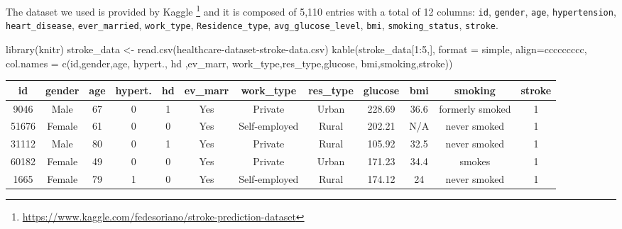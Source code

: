 \documentclass[
]{article}
\newenvironment{Shaded}{\begin{snugshade}}{\end{snugshade}}
\newcommand{\AttributeTok}[1]{\textcolor[rgb]{0.77,0.63,0.00}{#1}}
\newcommand{\DecValTok}[1]{\textcolor[rgb]{0.00,0.00,0.81}{#1}}
\newcommand{\FunctionTok}[1]{\textcolor[rgb]{0.00,0.00,0.00}{#1}}
\newcommand{\NormalTok}[1]{#1}
\newcommand{\OtherTok}[1]{\textcolor[rgb]{0.56,0.35,0.01}{#1}}
\newcommand{\SpecialCharTok}[1]{\textcolor[rgb]{0.00,0.00,0.00}{#1}}
\newcommand{\StringTok}[1]{\textcolor[rgb]{0.31,0.60,0.02}{#1}}
\begin{document}
The dataset we used is provided by Kaggle \footnote{\url{https://www.kaggle.com/fedesoriano/stroke-prediction-dataset}}
and it is composed of 5,110 entries with a total of 12 columns:
\texttt{id}, \texttt{gender}, \texttt{age}, \texttt{hypertension},
\texttt{heart\_disease}, \texttt{ever\_married}, \texttt{work\_type},
\texttt{Residence\_type}, \texttt{avg\_glucose\_level}, \texttt{bmi},
\texttt{smoking\_status}, \texttt{stroke}.

\begin{Shaded}
\begin{Highlighting}[]
\FunctionTok{library}\NormalTok{(knitr)}
\NormalTok{stroke\_data }\OtherTok{\textless{}{-}} \FunctionTok{read.csv}\NormalTok{(}\StringTok{\textquotesingle{}healthcare{-}dataset{-}stroke{-}data.csv\textquotesingle{}}\NormalTok{)}
\FunctionTok{kable}\NormalTok{(stroke\_data[}\DecValTok{1}\SpecialCharTok{:}\DecValTok{5}\NormalTok{,], }\AttributeTok{format =} \StringTok{\textquotesingle{}simple\textquotesingle{}}\NormalTok{, }\AttributeTok{align=}\StringTok{\textquotesingle{}ccccccccc\textquotesingle{}}\NormalTok{, }
      \AttributeTok{col.names =} \FunctionTok{c}\NormalTok{(}\StringTok{\textquotesingle{}id\textquotesingle{}}\NormalTok{,}\StringTok{\textquotesingle{}gender\textquotesingle{}}\NormalTok{,}\StringTok{\textquotesingle{}age\textquotesingle{}}\NormalTok{, }\StringTok{\textquotesingle{}hypert.\textquotesingle{}}\NormalTok{, }\StringTok{\textquotesingle{}hd\textquotesingle{}}\NormalTok{ ,}\StringTok{\textquotesingle{}ev\_marr\textquotesingle{}}\NormalTok{,}
                    \StringTok{\textquotesingle{}work\_type\textquotesingle{}}\NormalTok{,}\StringTok{\textquotesingle{}res\_type\textquotesingle{}}\NormalTok{,}\StringTok{\textquotesingle{}glucose\textquotesingle{}}\NormalTok{, }\StringTok{\textquotesingle{}bmi\textquotesingle{}}\NormalTok{,}\StringTok{\textquotesingle{}smoking\textquotesingle{}}\NormalTok{,}\StringTok{\textquotesingle{}stroke\textquotesingle{}}\NormalTok{))}
\end{Highlighting}
\end{Shaded}

\begin{longtable}[]{@{}cccccccccccc@{}}
\toprule
id & gender & age & hypert. & hd & ev\_marr & work\_type & res\_type &
glucose & bmi & smoking & stroke \\
\midrule
\endhead
9046 & Male & 67 & 0 & 1 & Yes & Private & Urban & 228.69 & 36.6 &
formerly smoked & 1 \\
51676 & Female & 61 & 0 & 0 & Yes & Self-employed & Rural & 202.21 & N/A
& never smoked & 1 \\
31112 & Male & 80 & 0 & 1 & Yes & Private & Rural & 105.92 & 32.5 &
never smoked & 1 \\
60182 & Female & 49 & 0 & 0 & Yes & Private & Urban & 171.23 & 34.4 &
smokes & 1 \\
1665 & Female & 79 & 1 & 0 & Yes & Self-employed & Rural & 174.12 & 24 &
never smoked & 1 \\
\bottomrule
\end{longtable}
\end{document}
